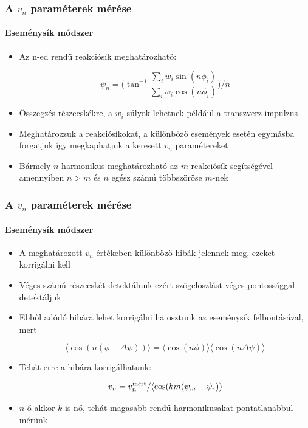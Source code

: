 \documentclass{beamer}
\begin{document}
\begin{frame}
\frametitle{A $v_n$ paraméterek mérése}
\framesubtitle{Eseménysík módszer}
\begin{itemize}
\item Az n-ed rendű reakciósík meghatározható:
\begin{center}
\begin{equation}
\psi_n = \Bigg(\tan^{-1}\frac{\sum_i w_i \sin(n\phi_i)}{\sum_i w_i \cos(n\phi_i)}\Bigg)\Big/n
\end{equation}
\end{center}
\item Összegzés részecskékre, a $w_i$ súlyok lehetnek például a transzverz impulzus
\item Meghatározzuk a reakciósíkokat, a különböző események esetén egymásba forgatjuk így megkaphatjuk a keresett $v_n$ paramétereket
\item Bármely $n$ harmonikus meghatározható az $m$ reakciósík segítségével amennyiben $n>m$ és $n$ egész számú többszöröse $m$-nek
\end{itemize}
\end{frame}


\begin{frame}
\frametitle{A $v_n$ paraméterek mérése}
\framesubtitle{Eseménysík módszer}
\begin{itemize}
\item A meghatározott $v_n$ értékeben különböző hibák jelennek meg, ezeket korrigálni kell
\item Véges számú részecskét detektálunk ezért szögeloszlást véges pontossággal detektáljuk
\item Ebből adódó hibára lehet korrigálni ha osztunk az eseménysík felbontásával, mert
\begin{center}
\begin{equation}
\langle \cos(n(\phi-\Delta \psi))\rangle = \langle \cos(n\phi)\rangle\langle\cos(n\Delta\psi)\rangle
\end{equation}
\end{center}
\item Tehát erre a hibára korrigálhatunk:
\begin{center}
\begin{equation}
v_n = v_n^{\rm mert}/\langle\cos(km(\psi_m-\psi_r))
\end{equation}
\end{center}
\item $n$ ő akkor $k$ is nő, tehát magasabb rendű harmonikusakat pontatlanabbul mérünk
\end{itemize}
\end{frame}
\end{document}
